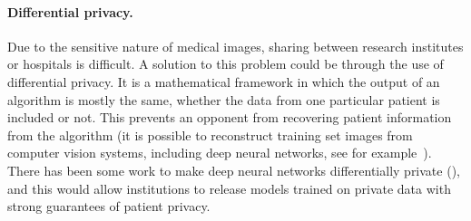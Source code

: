 \paragraph*{Differential privacy.}
Due to the sensitive nature of medical images, sharing between research institutes or hospitals is difficult. A solution to this problem could be through the use of differential privacy. It is a mathematical framework in which the output of an algorithm is mostly the same, whether the data from one particular patient is included or not. This prevents an opponent from recovering patient information from the algorithm (it is possible to reconstruct training set images from computer vision systems, including deep neural networks, see for example~\textcite{fredrikson2015}). There has been some work to make deep neural networks differentially private (\textcite{abadi2016}), and this would allow institutions to release models trained on private data with strong guarantees of patient privacy.





